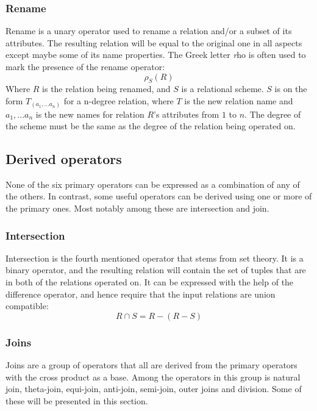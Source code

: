 \subsubsection{Rename}
\label{sect:theory:relAlg:rename}
Rename is a unary operator used to rename a relation and/or a subset of its attributes. The resulting relation
will be equal to the original one in all aspects except maybe some of its name properties. The Greek letter
\emph{r}ho is often used to mark the presence of the rename operator:
\begin{equation*}
\rho _{S}(R)
\end{equation*}
Where $R$ is the relation being renamed, and $S$ is a relational scheme. $S$ is on the form $T _{(a _{1},...a
_{n})}$ for a n-degree relation, where $T$ is the new relation name and $a _{1},...a _{n}$ is the new names for
relation $R$'s attributes from $1$ to $n$. The degree of the scheme must be the same as the degree of the relation
being operated on.

\subsection{Derived operators}
\label{sect:theory:relAlg:derivedOper}
None of the six primary operators can be expressed as a combination of any of the others. In contrast, some useful
operators can be derived using one or more of the primary ones. Most notably among these are intersection and join.

\subsubsection{Intersection}
\label{sect:theory:relAlg:intersection}
Intersection is the fourth mentioned operator that stems from set theory. It is a binary operator, and the
resulting relation will contain the set of tuples that are in both of the relations operated on. It can be
expressed with the help of the difference operator, and hence require that the input relations are union compatible:
\begin{equation*}
R \cap S = R-(R-S)
\end{equation*}

\subsubsection{Joins}
\label{sect:theory:relAlg:joins}
Joins are a group of operators that all are derived from the primary operators with the cross product as a base.
Among the operators in this group is natural join, theta-join, equi-join, anti-join, semi-join, outer joins and
division. Some of these will be presented in this section.

